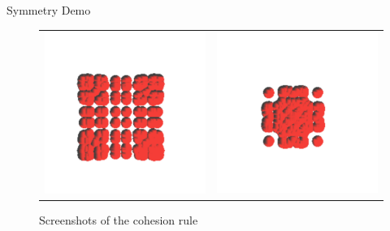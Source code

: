 \documentclass[red]{beamer}
\begin{document}
\begin{frame}{Symmetry Demo}
\begin{figure}[htbp]
\begin{center}
\begin{tabular}{cc}
	\includegraphics[scale= 0.25]{../figures/coh3.pdf} &
	\includegraphics[scale= 0.25]{../figures/coh4.pdf}
	\end{tabular}
	\end{center}
	\caption{Screenshots of the cohesion rule}
	\label{cohRule}
	\end{figure}
\end{frame}
\end{document}
